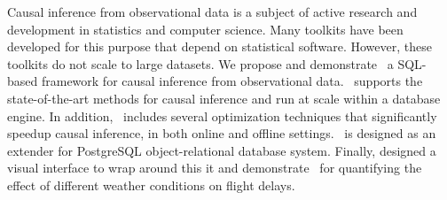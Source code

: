 Causal inference from observational data is a subject of active research and development in statistics and computer science.
Many toolkits have been developed for this purpose that depend on statistical software.
However, these toolkits do not scale to large datasets.
We propose and demonstrate \GSQL\ a SQL-based framework for causal inference from observational data.
\GSQL\ supports the state-of-the-art methods for causal inference and run at scale within a database engine.
In addition, \GSQL\ includes several optimization techniques that significantly speedup causal inference, in both online and offline settings. \GSQL\ is designed as an extender for PostgreSQL object-relational database system. Finally,  designed a visual interface to wrap around this it and demonstrate \GSQL\ for quantifying the effect of different weather conditions on flight delays. 